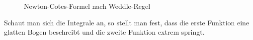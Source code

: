 \documentclass[11pt,a4paper,ngerman]{article}
\begin{document}
\begin{description}
\begin{figure}[ht]
\centering
{}
\caption{Newton-Cotes-Formel nach Weddle-Regel}
\end{figure}

Schaut man sich die Integrale an, so stellt man fest, dass die erste Funktion eine glatten Bogen beschreibt und die zweite Funktion extrem springt.


\end{description}
\end{document}

